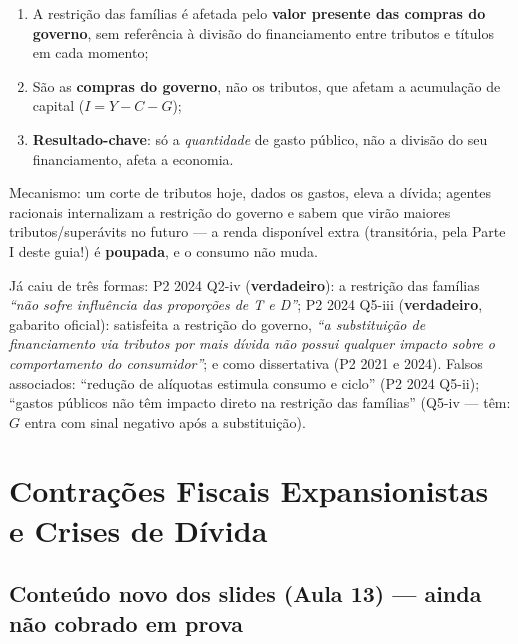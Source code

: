 \documentclass[12pt, a4paper]{article}
\begin{document}
\begin{resultbox}[title={Implicações (slides) e o mecanismo econômico}]
\begin{enumerate}[leftmargin=1.6em, itemsep=0.15em]
\item A restrição das famílias é afetada pelo \textbf{valor presente das
compras do governo}, sem referência à divisão do financiamento entre tributos
e títulos em cada momento;
\item São as \textbf{compras do governo}, não os tributos, que afetam a
acumulação de capital ($I = Y - C - G$);
\item \textbf{Resultado-chave}: só a \emph{quantidade} de gasto público, não a
divisão do seu financiamento, afeta a economia.
\end{enumerate}
Mecanismo: um corte de tributos hoje, dados os gastos, eleva a dívida; agentes
racionais internalizam a restrição do governo e sabem que virão maiores
tributos/superávits no futuro --- a renda disponível extra (transitória, pela
Parte I deste guia!) é \textbf{poupada}, e o consumo não muda.
\end{resultbox}

\begin{provabox}[title={Como cai na prova}]
Já caiu de três formas: P2 2024 Q2-iv (\textbf{verdadeiro}): a restrição das
famílias \emph{``não sofre influência das proporções de T e D''}; P2 2024
Q5-iii (\textbf{verdadeiro}, gabarito oficial): satisfeita a restrição do
governo, \emph{``a substituição de financiamento via tributos por mais dívida
não possui qualquer impacto sobre o comportamento do consumidor''}; e como
dissertativa (P2 2021 e 2024). Falsos associados: ``redução de alíquotas
estimula consumo e ciclo'' (P2 2024 Q5-ii); ``gastos públicos não têm impacto
direto na restrição das famílias'' (Q5-iv --- têm: $G$ entra com sinal negativo
após a substituição).
\end{provabox}

\section{Contrações Fiscais Expansionistas e Crises de Dívida}

\subsection{Conteúdo novo dos slides (Aula 13) --- ainda não cobrado em prova}
\end{document}
